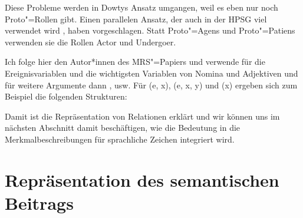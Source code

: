 \noindent
Diese Probleme werden in Dowtys Ansatz umgangen, weil es eben nur noch Proto"=Rollen gibt. Einen
parallelen Ansatz, der auch in der HPSG viel verwendet wird \citep*{Davis2001a-u,KD2003a-u,DKW2024a}, haben \citet{VanVL97a-u}
vorgeschlagen. Statt Proto"=Agens und Proto"=Patiens verwenden sie die Rollen Actor und Undergoer.

Ich folge hier den Autor*innen des MRS"=Papiers und verwende für die Ereignisvariablen und die
wichtigsten Variablen von Nomina und Adjektiven \argzero und für weitere Argumente dann \argone,
\argtwo usw. Für (e, x), (e, x, y) und (x) ergeben sich zum Beispiel die folgenden Strukturen:
\eal
\ex
{}
\ex
{}
\zl

\ea
{}
\z
Damit ist die Repräsentation von Relationen erklärt und wir können uns im nächsten Abschnitt damit
beschäftigen, wie die Bedeutung in die Merkmalbeschreibungen für sprachliche Zeichen integriert wird.


\section{Repräsentation des semantischen Beitrags}
\label{sec-CONT}

